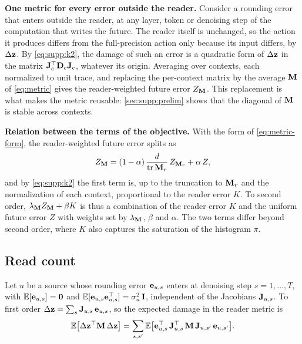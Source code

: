 \noindent\textbf{One metric for every error outside the reader.}
Consider a rounding error that enters outside the reader, at any layer, token or denoising step of the computation that writes the future.
The reader itself is unchanged, so the action it produces differs from the full-precision action only because its input differs, by $\Delta\mathbf{z}$.
By \cref{eq:supp:k2}, the damage of such an error is a quadratic form of $\Delta\mathbf{z}$ in the matrix $\mathbf{J}_c^\top \mathbf{D}_c \mathbf{J}_c$, whatever its origin.
Averaging over contexts, each normalized to unit trace, and replacing the per-context matrix by the average $\mathbf{M}$ of \cref{eq:metric} gives the reader-weighted future error $Z_{\mathbf{M}}$.
This replacement is what makes the metric reusable: \cref{sec:supp:prelim} shows that the diagonal of $\mathbf{M}$ is stable across contexts.

\noindent\textbf{Relation between the terms of the objective.}
With the form of \cref{eq:metric-form}, the reader-weighted future error splits as
\begin{equation}
  Z_{\mathbf{M}} = (1-\alpha)\,\frac{d}{\operatorname{tr}\mathbf{M}_r}\, Z_{\mathbf{M}_r} + \alpha\, Z ,
  \label{eq:supp:split}
\end{equation}
and by \cref{eq:supp:k2} the first term is, up to the truncation to $\mathbf{M}_r$ and the normalization of each context, proportional to the reader error $K$.
To second order, $\lambda_{\mathbf{M}} Z_{\mathbf{M}} + \beta K$ is thus a combination of the reader error $K$ and the uniform future error $Z$ with weights set by $\lambda_{\mathbf{M}}$, $\beta$ and $\alpha$.
The two terms differ beyond second order, where $K$ also captures the saturation of the histogram $\pi$.

\subsection{Read count}
\label{sec:supp:theory:count}
Let $u$ be a source whose rounding error $\mathbf{e}_{u,s}$ enters at denoising step $s = 1, \dots, T$, with $\mathbb{E}[\mathbf{e}_{u,s}] = \mathbf{0}$ and $\mathbb{E}[\mathbf{e}_{u,s}\mathbf{e}_{u,s}^\top] = \sigma_u^2\, \mathbf{I}$, independent of the Jacobians $\mathbf{J}_{u,s}$.
To first order $\Delta\mathbf{z} = \sum_s \mathbf{J}_{u,s}\,\mathbf{e}_{u,s}$, so the expected damage in the reader metric is
\begin{equation}
  \mathbb{E}\big[\Delta\mathbf{z}^\top \mathbf{M}\, \Delta\mathbf{z}\big] = \sum_{s, s'} \mathbb{E}\big[\mathbf{e}_{u,s}^\top\, \mathbf{J}_{u,s}^\top\, \mathbf{M}\, \mathbf{J}_{u,s'}\, \mathbf{e}_{u,s'}\big].
  \label{eq:supp:damage}
\end{equation}


